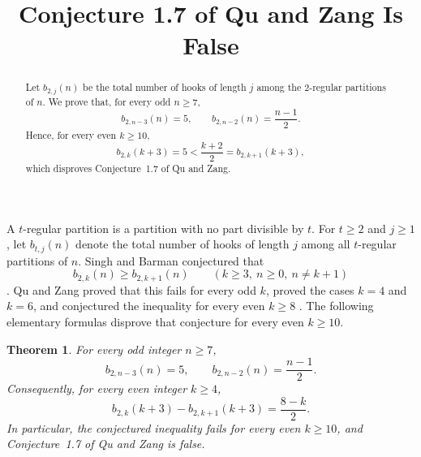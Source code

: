 \documentclass[11pt]{amsart}
\title[Conjecture 1.7 of Qu and Zang]
{Conjecture 1.7 of Qu and Zang Is False}
\date{}
\newtheorem{theorem}{Theorem}
\theoremstyle{remark}
\begin{document}
\begin{abstract}
Let $b_{2,j}(n)$ be the total number of hooks of length $j$ among the
$2$-regular partitions of $n$.  We prove that, for every odd $n\ge 7$,
\[
 b_{2,n-3}(n)=5,
 \qquad
 b_{2,n-2}(n)=\frac{n-1}{2}.
\]
Hence, for every even $k\ge 10$,
\[
 b_{2,k}(k+3)=5<\frac{k+2}{2}=b_{2,k+1}(k+3),
\]
which disproves Conjecture~1.7 of Qu and Zang.
\end{abstract}

\maketitle

A $t$-regular partition is a partition with no part divisible by $t$.
For $t\ge2$ and $j\ge1$, let $b_{t,j}(n)$ denote the total number of
hooks of length $j$ among all $t$-regular partitions of $n$.  Singh and
Barman conjectured that
\[
 b_{2,k}(n)\ge b_{2,k+1}(n)
 \qquad (k\ge3,\ n\ge0,\ n\ne k+1)
\]
\cite[Conjecture~1.6]{SinghBarman}.  Qu and Zang proved that this fails
for every odd $k$, proved the cases $k=4$ and $k=6$, and conjectured the
inequality for every even $k\ge8$ \cite[Theorems~1.4--1.6 and
Conjecture~1.7]{QuZang}.  The following elementary formulas disprove
that conjecture for every even $k\ge10$.

\begin{theorem}\label{thm:main}
For every odd integer $n\ge7$,
\[
 b_{2,n-3}(n)=5,
 \qquad
 b_{2,n-2}(n)=\frac{n-1}{2}.
\]
Consequently, for every even integer $k\ge4$,
\[
 b_{2,k}(k+3)-b_{2,k+1}(k+3)=\frac{8-k}{2}.
\]
In particular, the conjectured inequality fails for every even
$k\ge10$, and Conjecture~1.7 of Qu and Zang is false.
\end{theorem}
\end{document}
